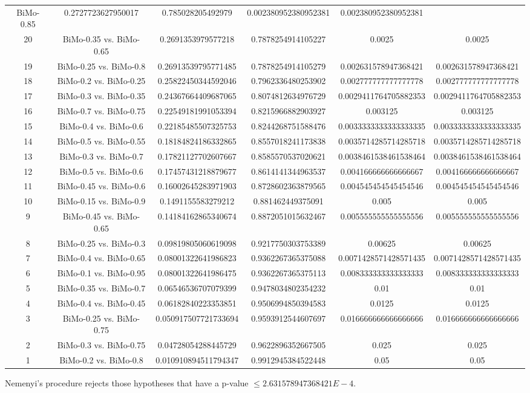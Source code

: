 \documentclass[a4paper,10pt]{article}
\begin{document}
\begin{landscape}
\begin{table}[!htp]
\begin{tabular}{cccccc}
BiMo-0.85&0.2727723627950017&0.785028205492979&0.002380952380952381&0.002380952380952381\\20&BiMo-0.35 vs. BiMo-0.65&0.2691353979577218&0.7878254914105227&0.0025&0.0025\\19&BiMo-0.25 vs. BiMo-0.8&0.26913539795771485&0.7878254914105279&0.002631578947368421&0.002631578947368421\\18&BiMo-0.2 vs. BiMo-0.25&0.25822450344592046&0.7962336480253902&0.002777777777777778&0.002777777777777778\\17&BiMo-0.3 vs. BiMo-0.35&0.24367664409687065&0.8074812634976729&0.0029411764705882353&0.0029411764705882353\\16&BiMo-0.7 vs. BiMo-0.75&0.22549181991053394&0.8215966882903927&0.003125&0.003125\\15&BiMo-0.4 vs. BiMo-0.6&0.22185485507325753&0.8244268751588476&0.0033333333333333335&0.0033333333333333335\\14&BiMo-0.5 vs. BiMo-0.55&0.18184824186332865&0.8557018241173838&0.0035714285714285718&0.0035714285714285718\\13&BiMo-0.3 vs. BiMo-0.7&0.17821127702607667&0.8585570537020621&0.0038461538461538464&0.0038461538461538464\\12&BiMo-0.5 vs. BiMo-0.6&0.17457431218879677&0.8614141344963537&0.004166666666666667&0.004166666666666667\\11&BiMo-0.45 vs. BiMo-0.6&0.16002645283971903&0.8728602363879565&0.004545454545454546&0.004545454545454546\\10&BiMo-0.15 vs. BiMo-0.9&0.1491155583279212&0.881462449375091&0.005&0.005\\9&BiMo-0.45 vs. BiMo-0.65&0.14184162865340674&0.8872051015632467&0.005555555555555556&0.005555555555555556\\8&BiMo-0.25 vs. BiMo-0.3&0.09819805060619098&0.9217750303753389&0.00625&0.00625\\7&BiMo-0.4 vs. BiMo-0.65&0.08001322641986823&0.9362267365375088&0.0071428571428571435&0.0071428571428571435\\6&BiMo-0.1 vs. BiMo-0.95&0.08001322641986475&0.9362267365375113&0.008333333333333333&0.008333333333333333\\5&BiMo-0.35 vs. BiMo-0.7&0.06546536707079399&0.9478034802354232&0.01&0.01\\4&BiMo-0.4 vs. BiMo-0.45&0.06182840223353851&0.9506994850394583&0.0125&0.0125\\3&BiMo-0.25 vs. BiMo-0.75&0.050917507721733694&0.9593912544607697&0.016666666666666666&0.016666666666666666\\2&BiMo-0.3 vs. BiMo-0.75&0.04728054288445729&0.9622896352667505&0.025&0.025\\1&BiMo-0.2 vs. BiMo-0.8&0.010910894511794347&0.9912945384522448&0.05&0.05\\\hline
\end{tabular}
\end{table}
Nemenyi's procedure rejects those hypotheses that have a p-value $\le2.631578947368421E-4$.



\end{landscape}
\end{document}
